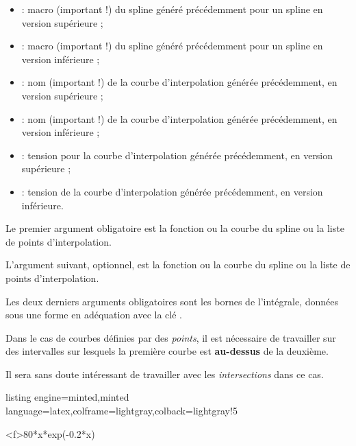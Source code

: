 \documentclass[11pt,a4paper]{ltxdoc}
\begin{document}
\begin{itemize}
  \item {} : macro (important !) du spline généré précédemment pour un spline en version supérieure ;
  \item {} : macro (important !) du spline généré précédemment pour un spline en version inférieure ;
  \item {} : nom (important !) de la courbe d'interpolation générée précédemment, en version supérieure ;
  \item {} : nom (important !) de la courbe d'interpolation générée précédemment, en version inférieure ;
  \item {} : tension pour la courbe d'interpolation générée précédemment, en version supérieure ;
  \item {} : tension de la courbe d'interpolation générée précédemment, en version inférieure.
\end{itemize}

\smallskip

Le premier argument obligatoire est la fonction ou la courbe du spline ou la liste de points d'interpolation.

\smallskip

L'argument suivant, optionnel, est la fonction ou la courbe du spline ou la liste de points d'interpolation.

\smallskip

Les deux derniers arguments obligatoires sont les bornes de l'intégrale, données sous une forme en adéquation avec la clé .

\pagebreak

Dans le cas de courbes définies par des \textit{points}, il est nécessaire de travailler sur des intervalles sur lesquels la première courbe est \textbf{au-dessus} de la deuxième.

Il sera sans doute intéressant de travailler avec les \textit{intersections} dans ce cas.

\begin{tcblisting}{listing engine=minted,minted language=latex,colframe=lightgray,colback=lightgray!5}
\begin{GraphiqueTikz}%
  [x=0.6cm,y=0.06cm,
  Xmin=0,Xmax=21,Xgrille=1,Xgrilles=0.5,
  Ymin=0,Ymax=155,Ygrille=10,Ygrilles=5]
  \TracerAxesGrilles%
    [Grads=false,Elargir=2.5mm]{}{}
  \DefinirCourbe[Nom=cf,Debut=1,Fin=20,Couleur=red]<f>{80*x*exp(-0.2*x)}
\end{GraphiqueTikz}
\end{tcblisting}
\end{document}
